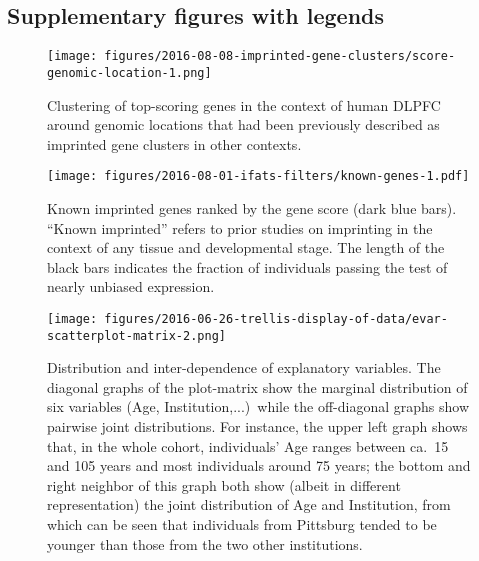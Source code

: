 \documentclass[letterpaper]{article}
\begin{document}
\subsection{Supplementary figures with legends}

\setcounter{figure}{0}
\makeatletter 
\renewcommand{\thefigure}{S\@arabic\c@figure}
\makeatother

\begin{figure}[H]
\begin{center}
\texttt{[image: figures/2016-08-08-imprinted-gene-clusters/score-genomic-location-1.png]}
\end{center}
\caption{
Clustering of top-scoring genes in the context of human DLPFC around genomic locations that
had been previously described as imprinted gene clusters in other contexts.
}
\label{fig:clusters}
\end{figure}

\begin{figure}[H]
\begin{center}
\texttt{[image: figures/2016-08-01-ifats-filters/known-genes-1.pdf]}
\caption{Known imprinted genes ranked by the gene score (dark blue bars).
``Known imprinted'' refers to prior studies on imprinting in the context of
any tissue and developmental stage.  The length of the
black bars indicates the fraction of individuals passing the test of nearly
unbiased expression.}
\label{fig:known-genes}
\end{center}
\end{figure}

\begin{figure}[H]
\begin{center}
\texttt{[image: figures/2016-06-26-trellis-display-of-data/evar-scatterplot-matrix-2.png]}
\end{center}
\caption{
Distribution and inter-dependence of explanatory variables.  The diagonal graphs of the
plot-matrix show the marginal distribution of six variables (Age,
Institution,...)~while the off-diagonal graphs show pairwise joint
distributions.  For instance, the upper left graph shows that, in the whole
cohort, individuals' Age
ranges between ca.~15 and 105 years and most individuals around 75 years; the
bottom and right neighbor of this graph both show (albeit in different
representation) the joint distribution of Age and Institution, from which can
be seen that individuals from Pittsburg tended to be younger than those from
the two other institutions.
}
\label{fig:predictor-associations}
\end{figure}
\end{document}
